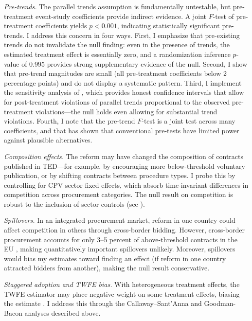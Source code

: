 \documentclass[12pt]{article}
\begin{document}
\textit{Pre-trends.} The parallel trends assumption is fundamentally untestable, but pre-treatment event-study coefficients provide indirect evidence. A joint $F$-test of pre-treatment coefficients yields $p < 0.001$, indicating statistically significant pre-trends. I address this concern in four ways. First, I emphasize that pre-existing trends do not invalidate the null finding: even in the presence of trends, the estimated treatment effect is essentially zero, and a randomization inference $p$-value of 0.995 provides strong supplementary evidence of the null. Second, I show that pre-trend magnitudes are small (all pre-treatment coefficients below 2 percentage points) and do not display a systematic pattern. Third, I implement the sensitivity analysis of \citet{rambachanRoth2023}, which provides honest confidence intervals that allow for post-treatment violations of parallel trends proportional to the observed pre-treatment violations---the null holds even allowing for substantial trend violations. Fourth, I note that the pre-trend $F$-test is a joint test across many coefficients, and that \citet{roth2022} has shown that conventional pre-tests have limited power against plausible alternatives.

\textit{Composition effects.} The reform may have changed the composition of contracts published in TED---for example, by encouraging more below-threshold voluntary publication, or by shifting contracts between procedure types. I probe this by controlling for CPV sector fixed effects, which absorb time-invariant differences in competition across procurement categories. The null result on competition is robust to the inclusion of sector controls (see ).

\textit{Spillovers.} In an integrated procurement market, reform in one country could affect competition in others through cross-border bidding. However, cross-border procurement accounts for only 3--5 percent of above-threshold contracts in the EU \citep{kutlinaDimitrovaLakatos2016}, making quantitatively important spillovers unlikely. Moreover, spillovers would bias my estimates toward finding an effect (if reform in one country attracted bidders from another), making the null result conservative.

\textit{Staggered adoption and TWFE bias.} With heterogeneous treatment effects, the TWFE estimator may place negative weight on some treatment effects, biasing the estimate \citep{deChaisemartinDhaultfoeuille2020}. I address this through the Callaway--Sant'Anna and Goodman-Bacon analyses described above.
\end{document}
